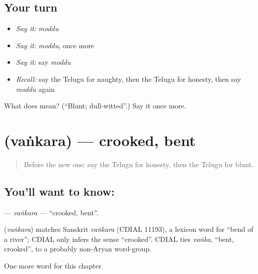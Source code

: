 \subsection*{Your turn}
\begin{itemize}
\raggedright
  \item \emph{Say it:} \emph{moddu}
  \item \emph{Say it:} \emph{moddu}, once more
  \item \emph{Say it:} say \emph{moddu}
  \item \emph{Recall:} say the Telugu for naughty, then the Telugu for honesty, then say \emph{moddu} again
\end{itemize}

\begin{tcolorbox}[breakable,colback=teal!4,colframe=teal!35!black,title={Before you move on}]
What does  mean? (\textquotedblleft{}Blunt; dull-witted\textquotedblright{}.) Say it once more.
\end{tcolorbox}
\section[\texorpdfstring{\te{వంకర} (vaṅkara)}{వంకర (vaṅkara)}]{ (vaṅkara) — crooked, bent}

\label{lesson:TE-C298-vankara}



\begin{quote}
Before the new one: say the Telugu for honesty, then the Telugu for blunt.
\end{quote}

\subsection*{You'll want to know: }
\textbf{} — \emph{vaṅkara} — \textquotedblleft{}crooked, bent\textquotedblright{}.

\begin{cousinweb}
\textbf{} (\emph{vaṅkara}) matches Sanskrit \emph{vaṅkara} (CDIAL 11193), a lexicon word for \textquotedblleft{}bend of a river\textquotedblright{}; CDIAL only infers the sense \textquotedblleft{}crooked\textquotedblright{}. CDIAL ties \emph{vaṅka}, \textquotedblleft{}bent, crooked\textquotedblright{}, to a probably non-Aryan word-group.
\end{cousinweb}

\begin{grammarlens}[title={What you've built}]
One more word for this chapter.
\end{grammarlens}

